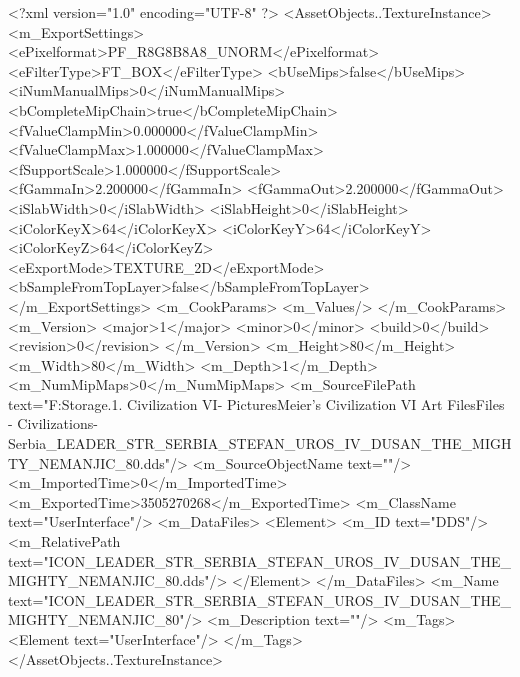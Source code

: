 <?xml version="1.0" encoding="UTF-8" ?>
<AssetObjects..TextureInstance>
	<m_ExportSettings>
		<ePixelformat>PF_R8G8B8A8_UNORM</ePixelformat>
		<eFilterType>FT_BOX</eFilterType>
		<bUseMips>false</bUseMips>
		<iNumManualMips>0</iNumManualMips>
		<bCompleteMipChain>true</bCompleteMipChain>
		<fValueClampMin>0.000000</fValueClampMin>
		<fValueClampMax>1.000000</fValueClampMax>
		<fSupportScale>1.000000</fSupportScale>
		<fGammaIn>2.200000</fGammaIn>
		<fGammaOut>2.200000</fGammaOut>
		<iSlabWidth>0</iSlabWidth>
		<iSlabHeight>0</iSlabHeight>
		<iColorKeyX>64</iColorKeyX>
		<iColorKeyY>64</iColorKeyY>
		<iColorKeyZ>64</iColorKeyZ>
		<eExportMode>TEXTURE_2D</eExportMode>
		<bSampleFromTopLayer>false</bSampleFromTopLayer>
	</m_ExportSettings>
	<m_CookParams>
		<m_Values/>
	</m_CookParams>
	<m_Version>
		<major>1</major>
		<minor>0</minor>
		<build>0</build>
		<revision>0</revision>
	</m_Version>
	<m_Height>80</m_Height>
	<m_Width>80</m_Width>
	<m_Depth>1</m_Depth>
	<m_NumMipMaps>0</m_NumMipMaps>
	<m_SourceFilePath text="F:\Mod Storage\2.1. Civilization VI\Mods\Archive - Pictures\Sid Meier's Civilization VI Art Files\Art Files - Civilizations\Civilization - Serbia\ICON_LEADER_STR_SERBIA_STEFAN_UROS_IV_DUSAN_THE_MIGHTY_NEMANJIC_80.dds"/>
	<m_SourceObjectName text=""/>
	<m_ImportedTime>0</m_ImportedTime>
	<m_ExportedTime>3505270268</m_ExportedTime>
	<m_ClassName text="UserInterface"/>
	<m_DataFiles>
		<Element>
			<m_ID text="DDS"/>
			<m_RelativePath text="ICON_LEADER_STR_SERBIA_STEFAN_UROS_IV_DUSAN_THE_MIGHTY_NEMANJIC_80.dds"/>
		</Element>
	</m_DataFiles>
	<m_Name text="ICON_LEADER_STR_SERBIA_STEFAN_UROS_IV_DUSAN_THE_MIGHTY_NEMANJIC_80"/>
	<m_Description text=""/>
	<m_Tags>
		<Element text="UserInterface"/>
	</m_Tags>
</AssetObjects..TextureInstance>

